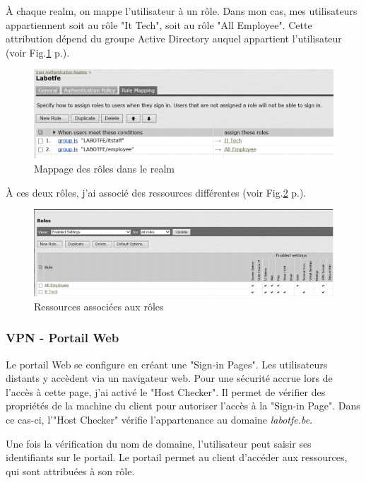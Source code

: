 À chaque realm, on mappe l'utilisateur à un rôle.
Dans mon cas, mes utilisateurs appartiennent soit au rôle "It Tech", soit au rôle "All Employee".
Cette attribution dépend du groupe Active Directory auquel appartient l'utilisateur (voir Fig.\ref{fig:mapRoles} p.\pageref{fig:mapRoles}). 
\begin{figure}[ht]
	\centering
	\includegraphics[width=16cm]{juniper/Rolemapping.png}
	\caption{Mappage des rôles dans le realm}
	\label{fig:mapRoles}
\end{figure}

À ces deux rôles, j'ai associé des ressources différentes (voir Fig.\ref{fig:resRoles} p.\pageref{fig:resRoles}).
\begin{figure}[ht]
	\centering
	\includegraphics[width=16cm]{juniper/UserRoles.png}
	\caption{Ressources associées aux rôles}
	\label{fig:resRoles}
\end{figure}

\subsubsection{VPN - Portail Web}
Le portail Web se configure en créant une "Sign-in Pages".
Les utilisateurs distants y accèdent via un navigateur web.
Pour une sécurité accrue lors de l'accès à cette page, j'ai activé le "Host Checker".
Il permet de vérifier des propriétés de la machine du client pour autoriser l'accès à la "Sign-in Page".
Dans ce cas-ci, l'"Host Checker" vérifie l'appartenance au domaine \textit{labotfe.be}. 

Une fois la vérification du nom de domaine, l'utilisateur peut saisir ses identifiants sur le portail.
Le portail permet au client d'accéder aux ressources, qui sont attribuées à son rôle.


